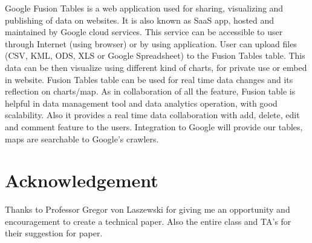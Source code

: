 \documentclass[9pt,twocolumn,twoside]{../../styles/osajnl}
\begin{document}
Google Fusion Tables is a web application used for sharing, visualizing and publishing of data on websites. It is also known as SaaS app, hosted and maintained by Google cloud services. This service can be accessible to user through Internet (using browser) or by using application. User can upload files (CSV, KML, ODS, XLS or Google Spreadsheet) to the Fusion Tables table. This data can be then visualize using different kind of charts, for private use or embed in website. Fusion Tables table can be used for real time data changes and its reflection on charts/map. As in collaboration of all the feature, Fusion table is helpful in data management tool and data analytics operation, with good scalability. Also it provides a real time data collaboration with add, delete, edit and comment feature to the users. Integration to Google will provide our tables, maps are searchable to Google’s crawlers.  


\section{Acknowledgement}


Thanks to Professor Gregor von Laszewski for giving me an opportunity and encouragement to create a technical paper.
Also the entire class and TA's for their suggestion for paper.



 
\end{document}
